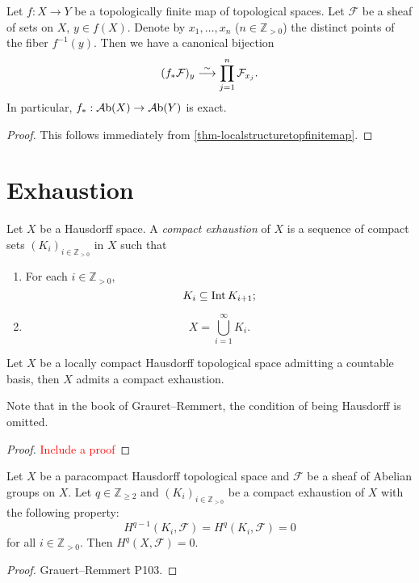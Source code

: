 \begin{corollary}\label{cor-pushforwardsheaffinite}
    Let $f:X\rightarrow Y$ be a topologically finite map of topological spaces. Let $\mathcal{F}$ be a sheaf of sets on $X$, $y\in f(X)$. Denote by $x_1,\ldots,x_n$ ($n\in \mathbb{Z}_{>0}$) the distinct points of the fiber $f^{-1}(y)$. Then we have a canonical bijection
    \[
        (f_*\mathcal{F})_y\stackrel{\sim}{\longrightarrow} \prod_{j=1}^n \mathcal{F}_{x_j}.
    \]
    In particular, $f_*:\mathcal{A}\mathrm{b}(X)\rightarrow \mathcal{A}\mathrm{b}(Y)$ is exact.
\end{corollary}
\begin{proof}
    This follows immediately from \cref{thm-localstructuretopfinitemap}.
\end{proof}


\section{Exhaustion}

\begin{definition}\label{def-exhaustion}
    Let $X$ be a Hausdorff space. A \emph{compact exhaustion} of $X$ is a sequence of compact sets $(K_i)_{i\in \mathbb{Z}_{>0}}$ in $X$ such that 
    \begin{enumerate}
        \item For each $i\in \mathbb{Z}_{>0}$,
            \[
                K_i\subseteq \operatorname{Int} K_{i+1};  
            \]
        \item 
            \[
                X=\bigcup_{i=1}^{\infty}K_i.
            \]
    \end{enumerate}
\end{definition}

\begin{proposition}
    Let $X$ be a locally compact Hausdorff topological space admitting a countable basis, then $X$ admits a compact exhaustion.
\end{proposition}
Note that in the book of Grauret--Remmert, the condition of being Hausdorff is omitted.
\begin{proof}
    \textcolor{red}{Include a proof}
\end{proof}

\begin{lemma}\label{lma-exhaustioncoh}
    Let $X$ be a paracompact Hausdorff topological space and $\mathcal{F}$ be a sheaf of Abelian groups on $X$. Let $q\in \mathbb{Z}_{\geq 2}$ and $(K_i)_{i\in \mathbb{Z}_{>0}}$ be a compact exhaustion of $X$ with the following property:
    \[
        H^{q-1}(K_i,\mathcal{F})=H^q(K_i,\mathcal{F})=0  
    \]
    for all $i\in \mathbb{Z}_{>0}$. Then $H^q(X,\mathcal{F})=0$.
\end{lemma}
\begin{proof}
    Grauert--Remmert P103.
\end{proof}


